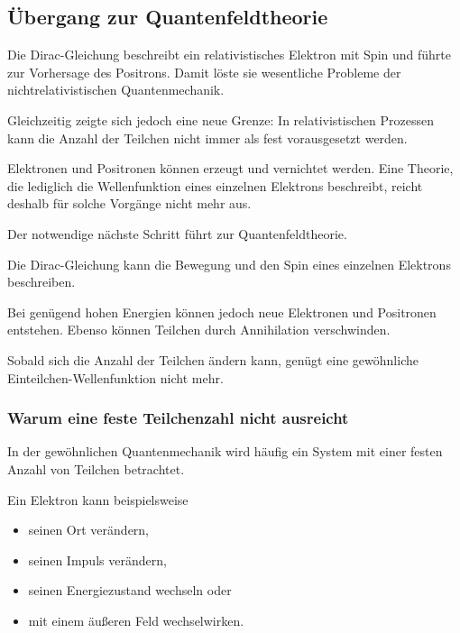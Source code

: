 
\subsection{Übergang zur Quantenfeldtheorie}
\label{subsec:uebergang_zur_quantenfeldtheorie}

Die Dirac-Gleichung
beschreibt ein relativistisches Elektron mit Spin und führte zur
Vorhersage des Positrons. Damit löste sie wesentliche Probleme der
nichtrelativistischen Quantenmechanik.

Gleichzeitig zeigte sich jedoch eine neue Grenze: In relativistischen
Prozessen kann die Anzahl der Teilchen nicht immer als fest
vorausgesetzt werden.

Elektronen und Positronen können erzeugt und vernichtet werden. Eine
Theorie, die lediglich die Wellenfunktion eines einzelnen Elektrons
beschreibt, reicht deshalb für solche Vorgänge nicht mehr aus.

Der notwendige nächste Schritt führt zur
Quantenfeldtheorie.

\begin{DidacticBox}
	\label{box:grenze_einteilchentheorie}
	
	Die Dirac-Gleichung kann die Bewegung und den Spin eines einzelnen
	Elektrons beschreiben.
	
	Bei genügend hohen Energien können jedoch neue Elektronen und
	Positronen entstehen. Ebenso können Teilchen durch Annihilation
	verschwinden.
	
	Sobald sich die Anzahl der Teilchen ändern kann, genügt eine
	gewöhnliche Einteilchen-Wellenfunktion nicht mehr.
\end{DidacticBox}

\subsubsection*{Warum eine feste Teilchenzahl nicht ausreicht}

In der gewöhnlichen Quantenmechanik wird häufig ein System mit einer
festen Anzahl von Teilchen betrachtet.

Ein Elektron kann beispielsweise

\begin{itemize}
	\item seinen Ort verändern,
	\item seinen Impuls verändern,
	\item seinen Energiezustand wechseln oder
	\item mit einem äußeren Feld wechselwirken.
\end{itemize}


